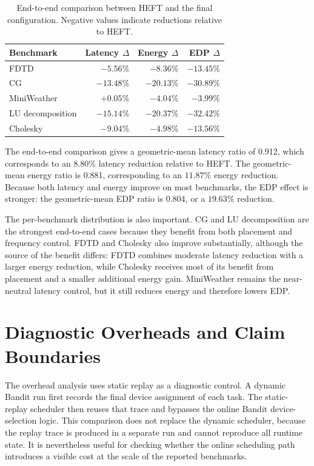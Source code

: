 \begin{table}[!htbp]
\centering
\begingroup
\footnotesize
\begin{tabular}{@{}lrrr@{}}
\toprule
Benchmark & Latency \(\Delta\) & Energy \(\Delta\) & EDP \(\Delta\) \\
\midrule
FDTD & \(-5.56\%\) & \(-8.36\%\) & \(-13.45\%\) \\
CG & \(-13.48\%\) & \(-20.13\%\) & \(-30.89\%\) \\
MiniWeather & \(+0.05\%\) & \(-4.04\%\) & \(-3.99\%\) \\
LU decomposition & \(-15.14\%\) & \(-20.37\%\) & \(-32.42\%\) \\
Cholesky & \(-9.04\%\) & \(-4.98\%\) & \(-13.56\%\) \\
\bottomrule
\end{tabular}
\endgroup
\caption{End-to-end comparison between HEFT and the final \BanditWinDVFS{} configuration. Negative values indicate reductions relative to HEFT.}
\label{tab:results-end-to-end}
\end{table}

The end-to-end comparison gives a geometric-mean latency ratio of 0.912,
which corresponds to an \(8.80\%\) latency reduction relative to HEFT. The
geometric-mean energy ratio is 0.881, corresponding to an \(11.87\%\)
energy reduction. Because both latency and energy improve on most benchmarks,
the EDP effect is stronger: the geometric-mean EDP ratio is 0.804, or a
\(19.63\%\) reduction.

The per-benchmark distribution is also important. CG and LU decomposition are
the strongest end-to-end cases because they benefit from both placement and
frequency control. FDTD and Cholesky also improve substantially, although the
source of the benefit differs: FDTD combines moderate latency reduction with a
larger energy reduction, while Cholesky receives most of its benefit from
placement and a smaller additional energy gain. MiniWeather remains the
near-neutral latency control, but it still reduces energy and therefore lowers
EDP.

\section{Diagnostic Overheads and Claim Boundaries}
\label{sec:results-overhead}

The overhead analysis uses static replay as a diagnostic control. A dynamic
Bandit run first records the final device assignment of each task. The
static-replay scheduler then reuses that trace and bypasses the online Bandit
device-selection logic. This comparison does not replace the dynamic scheduler,
because the replay trace is produced in a separate run and cannot reproduce
all runtime state. It is nevertheless useful for checking whether the online
scheduling path introduces a visible cost at the scale of the reported
benchmarks.

